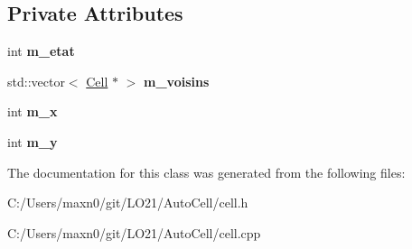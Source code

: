 \subsection*{Private Attributes}
\begin{DoxyCompactItemize}
\item 
\mbox{\label{class_cell_a350cfee41db7450651de4e48543227c3}} 
int {\bfseries m\+\_\+etat}
\item 
\mbox{\label{class_cell_a7d781cbf0f2a5dffd13313b8eab86732}} 
std\+::vector$<$ \mbox{\hyperlink{class_cell}{Cell}} $\ast$ $>$ {\bfseries m\+\_\+voisins}
\item 
\mbox{\label{class_cell_ae38c546e6fd703965c8b62f750e68417}} 
int {\bfseries m\+\_\+x}
\item 
\mbox{\label{class_cell_a303c301e529e95ce1eadaf5b73ad41b2}} 
int {\bfseries m\+\_\+y}
\end{DoxyCompactItemize}


The documentation for this class was generated from the following files\+:\begin{DoxyCompactItemize}
\item 
C\+:/\+Users/maxn0/git/\+L\+O21/\+Auto\+Cell/cell.\+h\item 
C\+:/\+Users/maxn0/git/\+L\+O21/\+Auto\+Cell/cell.\+cpp\end{DoxyCompactItemize}
